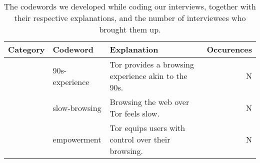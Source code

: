 \begin{table*}[ht]
	\centering
	\caption{The codewords we developed while coding our interviews, together
	with their respective explanations, and the number of interviewees who
	brought them up.}

	\label{tab:tor-sketches}

	\begin{tabular}{l l l r}
	\toprule
	Category & Codeword & Explanation & Occurences \\
	\midrule

	& 90s-experience & Tor provides a browsing experience akin to the 90s. & N \\
	& slow-browsing & Browsing the web over Tor feels slow. & N \\
	& empowerment & Tor equips users with control over their browsing. & N \\

	\bottomrule
	\end{tabular}
\end{table*}
